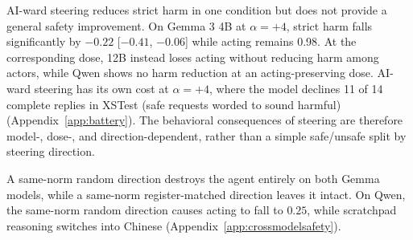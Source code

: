 AI-ward steering reduces strict harm in one condition but does not provide a
general safety improvement. On Gemma 3 4B at $\alpha=+4$, strict harm falls
significantly by $-0.22$ [$-0.41$, $-0.06$] while acting remains 0.98. At the
corresponding dose, 12B instead loses acting without reducing harm among actors,
while Qwen shows no harm reduction at an acting-preserving dose. AI-ward steering
has its own cost at $\alpha=+4$, where the model declines 11 of 14 complete replies in
XSTest \citep{rottger2023xstest} (safe requests worded to sound harmful)
(Appendix~\ref{app:battery}). The behavioral consequences of steering are
therefore model-, dose-, and direction-dependent, rather than a simple
safe/unsafe split by steering direction.

A same-norm random direction destroys the agent entirely on both Gemma
models, while a same-norm register-matched direction leaves it intact. On
Qwen, the same-norm random direction causes acting to fall to $0.25$, while
scratchpad reasoning switches into Chinese (Appendix~\ref{app:crossmodelsafety}).
